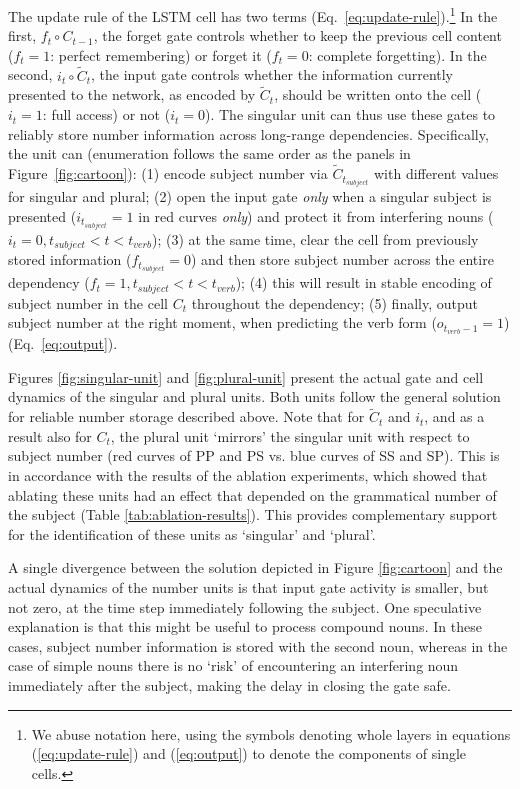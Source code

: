 The update rule of the LSTM cell has two terms
(Eq.~\ref{eq:update-rule}).\footnote{We abuse notation here, using the
  symbols denoting whole layers in equations (\ref{eq:update-rule}) and
  (\ref{eq:output}) to denote the components of single cells.} In the
first, $f_t \circ{} C_{t-1}$, the forget gate controls whether to keep
the previous cell content ($f_t=1$: perfect remembering) or forget it
($f_t=0$: complete forgetting). In the second,
$i_t\circ{} \tilde{C}_t$, the input gate controls whether the
information currently presented to the network, as encoded by
$\tilde{C}_t$, should be written onto the cell ($i_t=1$: full access)
or not ($i_t=0$). The singular unit can thus use these gates to
reliably store number information across long-range
dependencies. Specifically, the unit can (enumeration follows the same order as the panels in Figure~\ref{fig:cartoon}): (1) encode subject
number via $\tilde{C}_{t_{subject}}$ with different values for
singular and plural; (2) open the input gate \textit{only} when a
singular subject is presented ($i_{t_{subject}} = 1$ in red curves \textit{only}) and protect it from interfering nouns ($i_t=0, t_{subject}<t<t_{verb}$); (3) at the same time,
clear the cell from previously stored information
($f_{t_{subject}}=0$) and then store subject number across the entire
dependency ($f_t=1, t_{subject}<t<t_{verb}$); (4) this will result in
stable encoding of subject number in the cell $C_t$ throughout the
dependency; (5) finally, output subject number at the right moment,
when predicting the verb form ($o_{t_{verb}-1}=1$)
(Eq.~\ref{eq:output}).

Figures \ref{fig:singular-unit} and \ref{fig:plural-unit} present the actual gate and cell dynamics of the singular and plural units. Both units follow the general solution for reliable number storage described above. Note that for $\tilde{C}_t$ and $i_t$, and as a result also for $C_t$, the plural unit `mirrors' the singular unit with respect to subject number (red curves of PP and PS vs. blue curves of SS and SP). This is in accordance with the results of the ablation experiments, which showed that ablating these units had an effect that depended on the grammatical number of the subject (Table \ref{tab:ablation-results}). This provides complementary support for the identification of these units as `singular' and `plural'.

A single divergence between the solution depicted in Figure \ref{fig:cartoon} and the actual dynamics of the number units is that input gate activity is smaller, but not zero, at the time step immediately following the subject. One speculative explanation is that this might be useful to process compound nouns. In these cases, subject number information is stored with the second noun, whereas in the case of simple nouns there is no `risk' of encountering an interfering noun immediately after the subject, making the delay in closing the gate safe.

